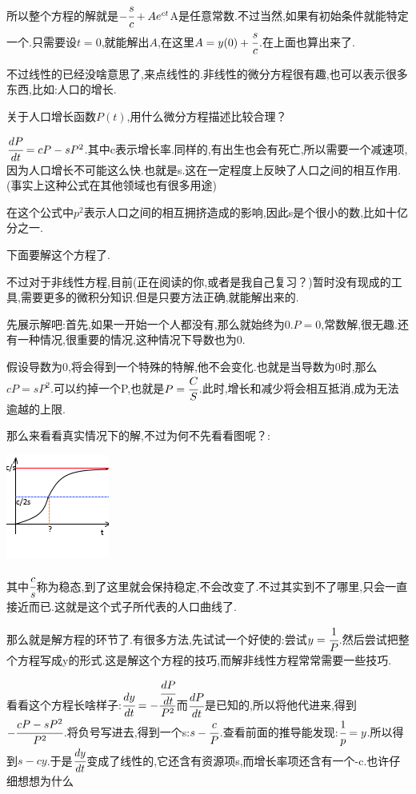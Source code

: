 \documentclass[UTF8,12pt]{ctexbook}
\begin{document}
{{{{  所以整个方程的解就是$-\cfrac{s}{c} + Ae^{ct}$A是任意常数.不过当然,如果有初始条件就能特定一个.只需要设$t = 0$,就能解出$A$,在这里$A = y(0) + \cfrac{s}{c}$.在上面也算出来了.

  不过线性的已经没啥意思了,来点线性的.非线性的微分方程很有趣,也可以表示很多东西,比如:人口的增长.

  关于人口增长函数$P(t)$,用什么微分方程描述比较合理？

  $\cfrac{dP}{dt} = cP - sP^2$.其中c表示增长率.同样的,有出生也会有死亡,所以需要一个减速项,因为人口增长不可能这么快.也就是s.这在一定程度上反映了人口之间的相互作用.(事实上这种公式在其他领域也有很多用途)

  在这个公式中$p^2$表示人口之间的相互拥挤造成的影响,因此s是个很小的数,比如十亿分之一.

  下面要解这个方程了.

  不过对于非线性方程,目前(正在阅读的你,或者是我自己复习？)暂时没有现成的工具,需要更多的微积分知识.但是只要方法正确,就能解出来的.

  先展示解吧:首先,如果一开始一个人都没有,那么就始终为0.$P = 0$,常数解,很无趣.还有一种情况,很重要的情况,这种情况下导数也为0.

  假设导数为0,将会得到一个特殊的特解,他不会变化.也就是当导数为0时,那么$cP = sP^2$.可以约掉一个P,也就是$P = \cfrac{C}{S}$.此时,增长和减少将会相互抵消,成为无法逾越的上限.

  那么来看看真实情况下的解,不过为何不先看看图呢？:

  \includegraphics{resources/nonLinearDifferencialEquation_HumanGrow.png}

  其中$\cfrac{c}{s}$称为稳态,到了这里就会保持稳定,不会改变了.不过其实到不了哪里,只会一直接近而已.这就是这个式子所代表的人口曲线了.

  那么就是解方程的环节了.有很多方法,先试试一个好使的:尝试$y = \cfrac{1}{P}$.然后尝试把整个方程写成y的形式.这是解这个方程的技巧,而解非线性方程常常需要一些技巧.

  看看这个方程长啥样子:$\cfrac{dy}{dt} = -\cfrac{\cfrac{dP}{dt}}{P^2}$而$\cfrac{dP}{dt}$是已知的,所以将他代进来,得到$-\cfrac{cP - sP^2}{P^2}$.将负号写进去,得到一个s:$s - \cfrac{c}{P}$.查看前面的推导能发现:$\cfrac{1}{p} = y$.所以得到$s - cy$.于是$\cfrac{dy}{dt}$变成了线性的,它还含有资源项s,而增长率项还含有一个-c.也许仔细想想为什么

}}}}
\end{document}
